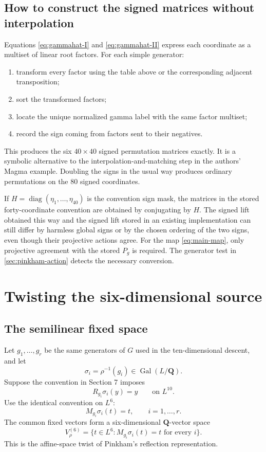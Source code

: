 \documentclass[11pt]{article}
\newcommand{\QQ}{\mathbf{Q}}
\newcommand{\Gal}{\operatorname{Gal}}
\begin{document}
\subsection{How to construct the signed matrices without interpolation}

Equations \eqref{eq:gammahat-I} and \eqref{eq:gammahat-II} express each coordinate
as a multiset of linear root factors.  For each simple generator:

\begin{enumerate}
\item transform every factor using the table above or the corresponding adjacent
transposition;
\item sort the transformed factors;
\item locate the unique normalized gamma label with the same factor multiset;
\item record the sign coming from factors sent to their negatives.
\end{enumerate}

This produces the six $40\times40$ signed permutation matrices exactly.  It is a
symbolic alternative to the interpolation-and-matching step in the authors' Magma
example.  Doubling the signs in the usual way produces ordinary permutations on
the $80$ signed coordinates.

If $H=\operatorname{diag}(\eta_1,\ldots,\eta_{40})$ is the convention
sign mask, the matrices in the stored forty-coordinate convention are obtained by
conjugating by $H$.  The signed lift obtained this way and the signed lift stored in
an existing implementation can still differ by harmless global signs or by the
chosen ordering of the two signs, even though their projective actions agree.  For the map \eqref{eq:main-map}, only
projective agreement with the stored $P_g$ is required.  The generator test in
\cref{sec:pinkham-action} detects the necessary conversion.

\section{Twisting the six-dimensional source}
\label{sec:source-descent}

\subsection{The semilinear fixed space}

Let $g_1,\ldots,g_r$ be the same generators of $G$ used in the ten-dimensional
descent, and let
\[
  \sigma_i=\rho^{-1}(g_i)\in\Gal(L/\QQ).
\]
Suppose the convention in Section 7 imposes
\[
  R_{g_i}\sigma_i(y)=y
  \qquad\text{on }L^{10}.
\]
Use the identical convention on $L^6$:
\begin{equation}
  M_{g_i}\sigma_i(t)=t,
  \qquad i=1,\ldots,r.
  \label{eq:source-fixed}
\end{equation}
The common fixed vectors form a six-dimensional $\QQ$-vector space
\[
  V_\rho^{(6)}
  =\{t\in L^6:M_{g_i}\sigma_i(t)=t\text{ for every }i\}.
\]
This is the affine-space twist of Pinkham's reflection representation.
\end{document}
